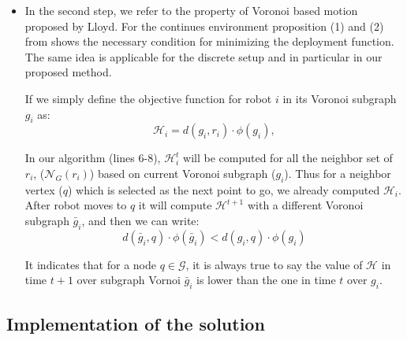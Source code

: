 \documentclass[twocolumn]{svjour3}       %
\begin{document}
\begin{itemize}
\begin{proof}

\end{proof}

Given above explanation, the deployment function $\mathcal{H}$ is decreasing during execution, so that:\\
\\
${t}<{t+1} \Rightarrow  \mathcal{H}(t)\geq \mathcal{H}({t+1})$\\
$\forall t \in \mathbb{R} ~~ B\leq \mathcal{H}(t)$, thus: ~~~   $B=\mathbf{Inf} \{\mathcal{H}(t)\}_{t \in \mathbb{R}}$\\

Since the sequence is lower bound to $B$ and decreasing, based on lemma \ref{lema1} we can conclude that $\mathcal{H}$ will converge to a value in $\infty$, consequently robots will stop in some points.
N 
\item In the second step, we refer to the property of Voronoi based motion proposed by Lloyd. For the continues environment proposition (1) and (2) from \cite{Pimenta2008} shows the necessary condition for minimizing the deployment function. The same idea is applicable for the discrete setup and in particular in our proposed method.

If we simply define the objective function for robot $i$ in its Voronoi subgraph $g_i$ as: 
%
\[\mathcal{H}_i=d(g_i,r_i)\cdot \phi(g_i),\]

In our algorithm (lines 6-8), $\mathcal{H}^t_i$ will be computed for all the neighbor set of $r_i$, ($\mathcal{N}_G(r_i)$) based on current Voronoi subgraph ($g_i$). Thus for a neighbor vertex ($q$) which is selected as the next point to go, we already computed $\mathcal{H}_i$.
%
After robot moves to $q$ it will compute $\mathcal{H}^{t+1}$ with a different Voronoi subgraph $\bar{g}_i$, and then we can write:
%
\[d(\bar{g}_i,q)\cdot \phi(\bar{g}_i)<d(g_i,q)\cdot \phi(g_i)\]

It indicates that for a node $q \in \mathcal{G}$, it is always true to say the value of $\mathcal{H}$ in time $t+1$ over subgraph Vornoi $\bar{g}_i$ is lower than the one in time $t$ over $g_i$.

\end{itemize}



\subsection{Implementation of the solution}
\label{sec:robotcontrol}
\end{document}
